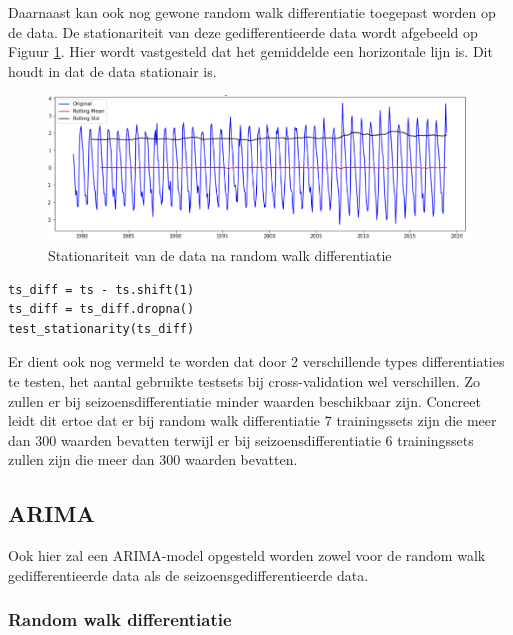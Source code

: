 Daarnaast kan ook nog gewone random walk differentiatie toegepast worden op de data. De stationariteit van deze gedifferentieerde data wordt afgebeeld op Figuur \ref{fig:uvsstationarityrw}. Hier wordt vastgesteld dat het gemiddelde een horizontale lijn is. Dit houdt in dat de data stationair is.

\begin{figure}[!h]
    \centering
    \caption{Stationariteit van de data na random walk differentiatie}
    \label{fig:uvsstationarityrw}
    \includegraphics[width=1\linewidth]{uvsstationarityrw}
\end{figure}

\clearpage
{}
\begin{verbatim}
ts_diff = ts - ts.shift(1)
ts_diff = ts_diff.dropna()
test_stationarity(ts_diff)
\end{verbatim}

Er dient ook nog vermeld te worden dat door 2 verschillende types differentiaties te testen, het aantal gebruikte testsets bij cross-validation wel verschillen. Zo zullen er bij seizoensdifferentiatie minder waarden beschikbaar zijn. Concreet leidt dit ertoe dat er bij random walk differentiatie 7 trainingssets zijn die meer dan 300 waarden bevatten terwijl er bij seizoensdifferentiatie 6 trainingssets zullen zijn die meer dan 300 waarden bevatten.

\subsection{ARIMA}

Ook hier zal een ARIMA-model opgesteld worden zowel voor de random walk gedifferentieerde data als de seizoensgedifferentieerde data.
\subsubsection{Random walk differentiatie}

